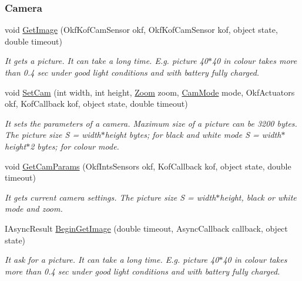 \subsubsection*{Camera} %
\label{ssub:Camera}
  \begin{DoxyCompactItemize}

  \item  void \hyperlink{class_elib_1_1_epuck_a93ba5219d4d0b3ac382a902b35e7e372}{GetImage} (OkfKofCamSensor okf, OkfKofCamSensor kof, object state, double timeout)
  \begin{DoxyCompactList}\small\item\em It gets a picture. It can take a long time. E.g. picture 40$\ast$40 in colour takes more than 0.4 sec under good light conditions and with battery fully charged. \item\end{DoxyCompactList}

  \item void \hyperlink{class_elib_1_1_epuck_a03911f706081e305b8602f921ad6b34b}{SetCam} (int width, int height, \hyperlink{namespace_elib_af2af0734145f6e03503f2379f6249669}{Zoom} zoom, \hyperlink{namespace_elib_acc08cc9ecc6edea0df55bcb7a1529c17}{CamMode} mode, OkfActuators okf, KofCallback kof, object state, double timeout)
  \begin{DoxyCompactList}\small\item\em It sets the parameters of a camera. Maximum size of a picture can be 3200 bytes. The picture size S = width$\ast$height bytes; for black and white mode S = width$\ast$height$\ast$2 bytes; for colour mode. \item\end{DoxyCompactList}

  \item  void \hyperlink{class_elib_1_1_epuck_a77057f06395cb1887ca3d504f1c51d2f}{GetCamParams} (OkfIntsSensors okf, KofCallback kof, object state, double timeout)
  \begin{DoxyCompactList}\small\item\em It gets current camera settings. The picture size S = width$\ast$height, black or white mode and zoom. \item\end{DoxyCompactList}
  \item   IAsyncResult \hyperlink{class_elib_1_1_epuck_afe274f8efd46c68587ec706f7dfc8a35}{BeginGetImage} (double timeout, AsyncCallback callback, object state)
  \begin{DoxyCompactList}\small\item\em It ask for a picture. It can take a long time. E.g. picture 40$\ast$40 in colour takes more than 0.4 sec under good light conditions and with battery fully charged. \item\end{DoxyCompactList}
  

\end{DoxyCompactItemize}
